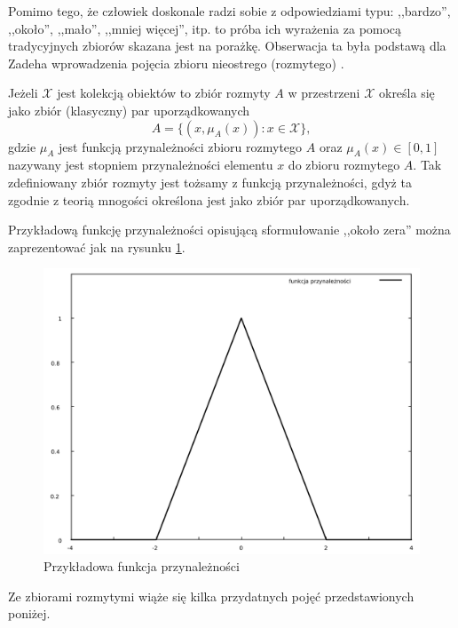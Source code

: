 Pomimo tego, że człowiek doskonale radzi sobie z odpowiedziami typu: ,,bardzo'',
,,około'', ,,mało'', ,,mniej więcej'', itp. to próba ich wyrażenia za pomocą
tradycyjnych zbiorów skazana jest na porażkę. Obserwacja ta była podstawą dla
Zadeha wprowadzenia pojęcia zbioru nieostrego (rozmytego) \cite{zadeh1965fuzzy}.

\begin{definition}
Jeżeli $\mathcal{X}$ jest kolekcją obiektów to zbiór rozmyty $A$ w przestrzeni
$\mathcal{X}$ określa się jako zbiór (klasyczny) par uporządkowanych
\begin{equation}
A = \{ (x, \mu_A(x)) : x \in \mathcal{X} \},
\end{equation}
gdzie $\mu_A$ jest funkcją przynależności zbioru rozmytego $A$ oraz $\mu_A(x)
\in [0,1]$ nazywany jest stopniem przynależności elementu $x$ do zbioru
rozmytego $A$. Tak zdefiniowany zbiór rozmyty jest tożsamy z funkcją
przynależności, gdyż ta zgodnie z teorią mnogości określona jest jako zbiór par
uporządkowanych.
\end{definition}

Przykładową funkcję przynależności opisującą sformułowanie ,,około zera'' można
zaprezentować jak na rysunku \ref{fig:funkcja_przynaleznosci}.

\begin{figure}[ht]
  \includegraphics[width=\linewidth]
  	{chapters/fuzzylogic/funkcja_przynaleznosci}
  \caption{Przykładowa funkcja przynależności}
  \label{fig:funkcja_przynaleznosci}
\end{figure}

Ze zbiorami rozmytymi wiąże się kilka przydatnych pojęć przedstawionych poniżej.

